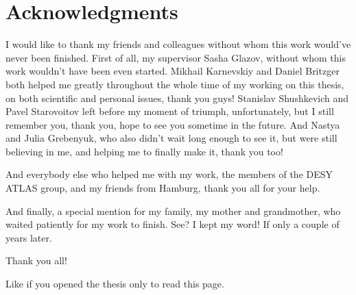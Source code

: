 \documentclass[oneside,11pt]{Classes/PhDthesisPSnPDF}
\begin{document}
\newpage
{}
\begin{tiny}
  \listoffigures
\end{tiny}


\newpage
{}



\newpage
\chapter*{Acknowledgments}

I would like to thank my friends and colleagues without whom this work would've never been finished. First of all, my supervisor Sasha Glazov, without whom this work wouldn't have been even started. Mikhail Karnevskiy and Daniel Britzger both helped me greatly throughout the whole time of my working on this thesis, on both scientific and personal issues, thank you guys! Stanislav Shushkevich and Pavel Starovoitov left before my moment of triumph, unfortunately, but I still remember you, thank you, hope to see you sometime in the future. And Nastya and Julia Grebenyuk, who also didn't wait long enough to see it, but were still believing in me, and helping me to finally make it, thank you too!

And everybody else who helped me with my work, the members of the DESY ATLAS group, and my friends from Hamburg, thank you all for your help.

And finally, a special mention for my family, my mother and grandmother, who waited patiently for my work to finish. See? I kept my word! If only a couple of years later.

\vspace{1cm}

Thank you all!

\vspace{3cm}

 Like if you opened the thesis only to read this page.
\end{document}
